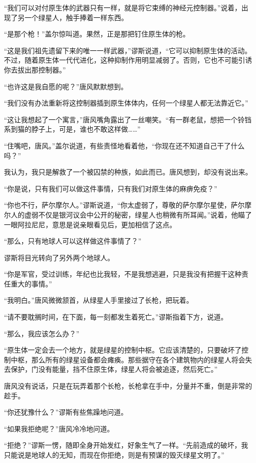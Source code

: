 “我们可以对付原生体的武器只有一样，就是将它束缚的神经元控制器。”说着，出现了另一个绿星人，触手捧着一样东西。

“是那个枪！”盖尔惊叫道。果然，正是那把钉住原生体的枪。

“这是我们祖先遗留下来的唯一一样武器，”谬斯说道，“它可以抑制原生体的活动。不过，随着原生体一代代进化，这种抑制作用明显减弱了。否则，它也不可能引诱你去拔出那控制器。”

“也许这是我自愿的呢？”唐风默默想到。

“我们没有办法重新将这控制器插到原生体体内，任何一个绿星人都无法靠近它。”

“这让我想起了一个寓言，”唐风嘴角露出了一丝嘲笑。“有一群老鼠，想把一个铃铛系到猫的脖子上，可是，谁也不敢这样做……”

“住嘴吧，唐风。”盖尔说道，有些责怪地看着他，“你现在还不知道自己干了什么吗？”

我认为，我只是解救了一个被囚禁的种族，如此而已。唐风想到，却没有说出来。

“你是说，只有我们可以做这件事情，只有我们对原生体的麻痹免疫？”

“你也不行，萨尔摩尔人。”谬斯说道，“你太虚弱了，尊敬的萨尔摩尔星使，萨尔摩尔人的虚弱不仅是银河议会中公开的秘密，绿星人也稍微有所耳闻。”说着，他瞄了一眼阿拉尼尼，意思是说亲眼看见后，更加相信了这点。

“那么，只有地球人可以这样做这件事情了？”

谬斯将目光转向了另外两个地球人。

“你是军官，受过训练，年纪也比我轻，不是我想逃避，只是我没有把握干这种责任重大的事情。”

“我明白。”唐风微微颔首，从绿星人手里接过了长枪，把玩着。

“请不要耽搁时间，在下面，每一刻都发生着死亡。”谬斯指着下方，说道。

“那么，我应该怎么办？”

“原生体一定会去一个地方，就是绿星的控制中枢。它应该清楚的，只要破坏了控制中枢，那么所有的绿星设备都会瘫痪。那些据守在各个建筑物内的绿星人将会失去保护，门没有能量，挡不住原生体，绿星人将会被追逐，然后死亡。”

唐风没有说话，只是在玩弄着那个长枪，长枪拿在手中，分量并不重，倒是非常的趁手。

“你还犹豫什么？”谬斯有些焦躁地问道。

“如果我拒绝呢？”唐风冷冷地问道。

“拒绝？”谬斯一愣，随即全身开始发红，好象生气了一样。“先前造成的破坏，我只能说是地球人的无知，而现在你拒绝，则是有预谋的毁灭绿星文明了。”

